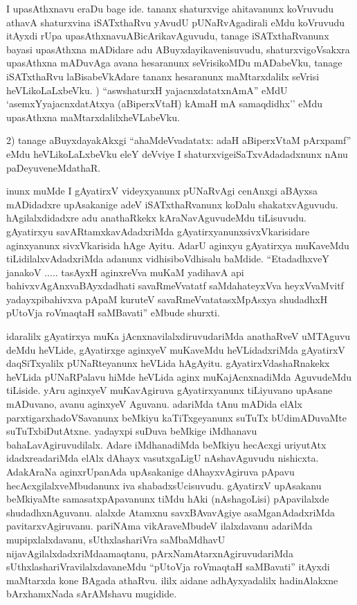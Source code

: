 \begin{artha}
I upasAthxnavu eraDu bage ide. tananx shaturxvige ahitavanunx koVruvudu athavA shaturxvina iSATxthaRvu yAvudU pUNaRvAgadirali eMdu koVruvudu itAyxdi rUpa upasAthxnavu\break ABicArikavAguvudu, tanage iSATxthaRvanunx bayasi upasAthxna mADidare adu ABuyxdayikavenisuvudu, shaturxvigoVsakxra upasAthxna mADuvAga avana hesaranunx seVrisikoMDu mADabeVku, tanage iSATxthaRvu laBisabeVkAdare tananx hesaranunx maMtarxdalilx seVrisi heVLikoLaLxbeVku.
) ``aswshaturxH yajacnxdatatxnAmA'' eMdU `asemxYyajacnxdatAtxya (aBiperxVtaH) kAmaH mA samaqdidhx'' eMdu upasAthxna maMtarxdalilx\break heVLabeVku.

2) tanage aBuyxdayakAkxgi ``ahaMdeVvadatatx: adaH aBiperxVtaM pArxpamf'' eMdu heVLikoLaLxbeVku eleY deVviye I shaturxvige\break iSaTxvAdadadxnunx nAnu paDeyuveneMdathaR.
\end{artha}

\begin{artha}
inunx muMde I gAyatirxV videyxyanunx pUNaRvAgi cenAnxgi aBAyxsa mADidadxre upAsakanige adeV iSATxthaRvanunx koDalu shakatxvAguvudu. hAgilalxdidadxre adu anathaRkekx kAraNavAguvudeMdu tiLisuvudu. gAyatirxyu savARtamxkavAdadxriMda gAyatirxyanunx\break sivxVkarisidare aginxyanunx sivxVkarisida hAge Ayitu. AdarU aginxyu gAyatirxya muKaveMdu tiLidilalxvAdadxriMda adanunx vidhisi\break boVdhisalu baMdide. ``EtadadhxveY janakoV ..... tasAyxH aginxreVva muKaM yadihavA api bahivxvAgAnxvaBAyxdadhati savaRmeVvatatf saMdahateyxVva heyxVvaMvitf yadayxpibahivxva pApaM kuruteV savaRmeVvatatasxMpAsxya shudadhxH pUtoV\s ja roV\s maqtaH saMBavati'' eMbude shurxti. 

idaralilx gAyatirxya muKa jAcnxnavilalxdiruvudariMda anathaRveV uMTAguvu deMdu heVLide, gAyatirxge aginxyeV muKaveMdu heVLidadxriMda gAyatirxV daqSiTxyalilx pUNaRteyanunx heVLida hAgAyitu. gAyatirxVdashaRnakekx heVLida pUNaRPalavu hiMde heVLida aginx muKajAcnxnadiMda AguvudeMdu tiLiside. yAru aginxyeV muKavAgiruva gAyatirxyanunx tiLiyuvano upAsane mADuvano, avanu aginxyeV Aguvanu. adariMda tAnu mADida elAlx parxtigarxhadoVSavanunx beMkiyu kaTiTxgeyanunx suTuTx bUdimADuvaMte suTuTxbiDutAtxne. yadayxpi suDuva beMkige iMdhanavu  bahaLavAgiruvudilalx. Adare iMdhanadiMda beMkiyu hecAcxgi uriyutAtx idadxre\break adariMda elAlx dAhayx vasutxgaLigU nAshavAguvudu nishicxta. AdakAraNa aginxrUpanAda upAsakanige dAhayxvAgiruva pApavu hecAcxgilalxveMbudanunx iva shabadxsUcisuvudu. gAyatirxV upAsakanu beMkiyaMte samasatxpApavanunx tiMdu hAki (nAshagoLisi) pApavilalxde shudadhxnAguvanu. alalxde Atamxnu savxBAvavAgiye asaMganAdadxriMda pavitarxvAgiruvanu. pariNAma vikAraveMbudeV ilalxdavanu adariMda mupipxlalxdavanu, sUthxlashariVra saMbaMdhavU nijavAgilalxdadxriMda\break amaqtanu, pArxNamAtarxnAgiruvudariMda sUthxlashariVravilalxdavaneMdu ``pUtoV\s ja roV\s maqtaH saMBavati'' itAyxdi maMtarxda kone BAgada athaRvu. ililx aidane adhAyxyadalilx hadinAlakxne bArxhamxNada sArAMshavu mugidide.
\end{artha}


